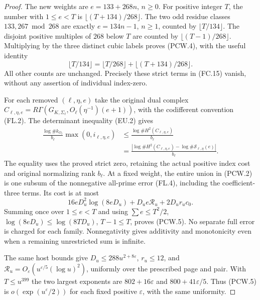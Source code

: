 \begin{proof}
The new weights are $e=133+268n$, $n\geq0$.
For positive integer $T$, the number with $1\leq e<T$ is
$\lfloor(T+134)/268\rfloor$.
The two odd residue classes $133,267\bmod268$ are exactly
$e=134n-1$, $n\geq1$, counted by $\lfloor T/134\rfloor$.
The disjoint positive multiples of $268$ below $T$ are counted
by $\lfloor(T-1)/268\rfloor$.
Multiplying by the three distinct cubic labels proves (PCW.4),
with the useful identity
\[
 \lfloor T/134\rfloor=\lfloor T/268\rfloor
                               +\lfloor(T+134)/268\rfloor.
 \tag{PCW.7}
\]
All other counts are unchanged.  Precisely these strict terms
in (FC.15) vanish, without any assertion of individual index-zero.

For each removed $(\ell,\eta,e)$ take the original dual complex
$C_{\ell,\eta,e}=R\Gamma(G_{K,\Sigma_\ell},
O_\ell(\eta^{-1})(e+1))$, with the codifferent convention (FL.2).
The determinant inequality (EU.2) gives
\[
 \begin{aligned}
 \frac{\log\#k_{O_\ell}}{b_\ell}\max(0,i_{\ell,\eta,e})
 &\leq\frac{\log\#H^2(C_{\ell,\eta,e})}{b_\ell}\\
 &=\frac{|\log\#H^2(C_{\ell,\eta,e})
                    -\log\#\mathcal S_{\ell,\eta}(e)|}{b_\ell}.
 \end{aligned}
 \tag{PCW.8}
\]
The equality uses the proved strict zero, retaining the actual
positive index cost and original normalizing rank $b_\ell$.
At a fixed weight, the entire union in (PCW.2) is one subsum
of the nonnegative all-prime error (FL.4), including the
coefficient-three terms.  Its cost is at most
\[
          16eD_u^2\log(8eD_u)+D_ue\mathcal R_u+2D_ur_uc_0.
 \tag{PCW.9}
\]
Summing once over $1\leq e<T$ and using $\sum e\leq T^2/2$,
$\log(8eD_u)\leq\log(8TD_u)$, $T-1\leq T$, proves (PCW.5).
No separate full error is charged for each family.
Nonnegativity gives additivity and monotonicity even when a
remaining unrestricted sum is infinite.

The same host bounds give $D_u\leq288u^{2+8\varepsilon}$,
$r_u\leq12$, and
$\mathcal R_u=O_\varepsilon(u^{\varepsilon/5}(\log u)^2)$,
uniformly over the prescribed page and pair.
With $T\leq u^{399}$ the two largest exponents are
$802+16\varepsilon$ and $800+41\varepsilon/5$.
Thus (PCW.5) is $o(\exp(u^\varepsilon/2))$ for each fixed
positive $\varepsilon$, with the same uniformity.


\end{proof}
